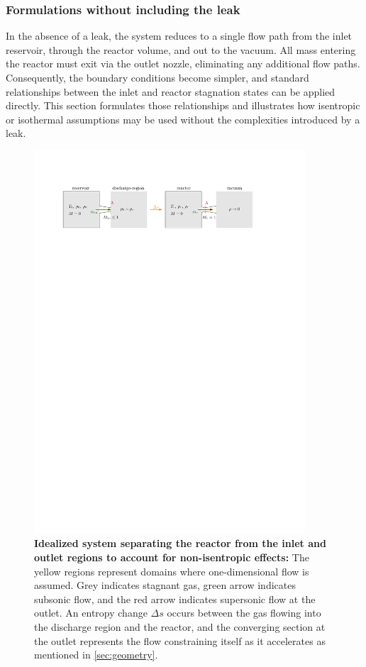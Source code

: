 \subsubsection*{Formulations without including the leak}
	In the absence of a leak, the system reduces to a single flow path from the inlet reservoir, through the reactor volume, and out to the vacuum.
	All mass entering the reactor must exit via the outlet nozzle, eliminating any additional flow paths.
	Consequently, the boundary conditions become simpler, and standard relationships between the inlet and reactor stagnation states can be applied directly.
	This section formulates those relationships and illustrates how isentropic or isothermal assumptions may be used without the complexities introduced by a leak.
	\begin{figure}[H]
	    \centering
	    \includegraphics[width=0.9\textwidth]{src/03_analytical-work/fig_disconnected-reservoirs.pdf}
	    \caption[Idealized system separating the reactor from the inlet and outlet regions to account for non-isentropic effects.]{
			\textbf{Idealized system separating the reactor from the inlet and outlet regions to account for non-isentropic effects:}
			The yellow regions represent domains where one-dimensional flow is assumed.
			Grey indicates stagnant gas, green arrow indicates subsonic flow, and the red arrow indicates supersonic flow at the outlet.
			An entropy change $\Delta s$ occurs between the gas flowing into the discharge region and the reactor, and the converging section at the outlet represents the flow constraining itself as it accelerates as mentioned in \ref{sec:geometry}.
		}
	    \label{fig:disconnected-reservoirs}
	\end{figure}
